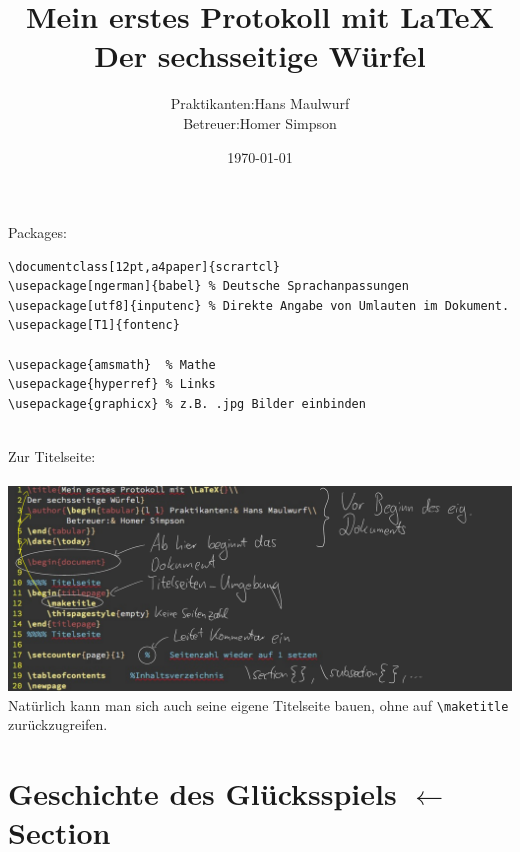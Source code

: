 \documentclass[12pt,a4paper]{scrartcl}
\title{Mein erstes Protokoll mit \LaTeX{}\\
Der sechsseitige Würfel}
\author{\begin{tabular}{l l} Praktikanten:& Hans Maulwurf\\
		Betreuer:& Homer Simpson
\end{tabular}}
\date{\today}
\begin{document}
\begin{titlepage}
    \maketitle
    \thispagestyle{empty}
\end{titlepage}

\setcounter{page}{1}    %

\tableofcontents     %
\newpage
\noindent Packages:
\begin{Verbatim}[frame=single]
\documentclass[12pt,a4paper]{scrartcl}
\usepackage[ngerman]{babel} % Deutsche Sprachanpassungen
\usepackage[utf8]{inputenc} % Direkte Angabe von Umlauten im Dokument. 
\usepackage[T1]{fontenc}

\usepackage{amsmath}  % Mathe
\usepackage{hyperref} % Links
\usepackage{graphicx} % z.B. .jpg Bilder einbinden
\end{Verbatim}
~\\
Zur Titelseite:\\~\\
\includegraphics[width=1.1\textwidth]{figures/titelseite.pdf}
Natürlich kann man sich auch seine eigene Titelseite bauen, ohne
auf \verb!\maketitle! zurückzugreifen.

\section[Geschichte des Glücksspiels]{Geschichte des Glücksspiels \quad
$\leftarrow$ Section}
\end{document}
